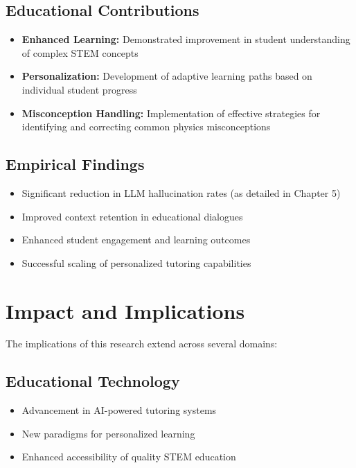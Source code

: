 \subsection{Educational Contributions}
\begin{itemize}
    \item \textbf{Enhanced Learning:} Demonstrated improvement in student understanding of complex STEM concepts
    \item \textbf{Personalization:} Development of adaptive learning paths based on individual student progress
    \item \textbf{Misconception Handling:} Implementation of effective strategies for identifying and correcting common physics misconceptions
\end{itemize}

\subsection{Empirical Findings}
\begin{itemize}
    \item Significant reduction in LLM hallucination rates (as detailed in Chapter 5)
    \item Improved context retention in educational dialogues
    \item Enhanced student engagement and learning outcomes
    \item Successful scaling of personalized tutoring capabilities
\end{itemize}

\section{Impact and Implications}
\label{sec:impact}

The implications of this research extend across several domains:

\subsection{Educational Technology}
\begin{itemize}
    \item Advancement in AI-powered tutoring systems
    \item New paradigms for personalized learning
    \item Enhanced accessibility of quality STEM education
\end{itemize}

